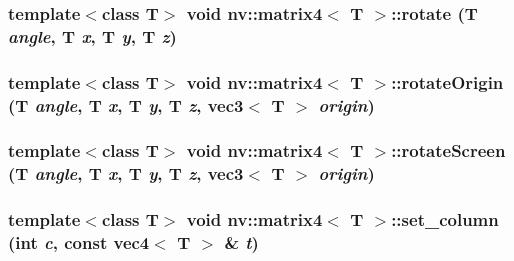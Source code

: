 \hypertarget{classnv_1_1matrix4_219e377b04b656c751c6d5ebdaa3505b}{
\subsubsection[{rotate}]{\setlength{\rightskip}{0pt plus 5cm}template$<$class T$>$ void {\bf nv::matrix4}$<$ T $>$::rotate (T {\em angle}, \/  T {\em x}, \/  T {\em y}, \/  T {\em z})}}
\label{classnv_1_1matrix4_219e377b04b656c751c6d5ebdaa3505b}


\hypertarget{classnv_1_1matrix4_addeaba225f0322e3819cc146b7a9887}{
\subsubsection[{rotateOrigin}]{\setlength{\rightskip}{0pt plus 5cm}template$<$class T$>$ void {\bf nv::matrix4}$<$ T $>$::rotateOrigin (T {\em angle}, \/  T {\em x}, \/  T {\em y}, \/  T {\em z}, \/  {\bf vec3}$<$ T $>$ {\em origin})}}
\label{classnv_1_1matrix4_addeaba225f0322e3819cc146b7a9887}


\hypertarget{classnv_1_1matrix4_0ce61396b900fbfeb6ac3cb93fb43a07}{
\subsubsection[{rotateScreen}]{\setlength{\rightskip}{0pt plus 5cm}template$<$class T$>$ void {\bf nv::matrix4}$<$ T $>$::rotateScreen (T {\em angle}, \/  T {\em x}, \/  T {\em y}, \/  T {\em z}, \/  {\bf vec3}$<$ T $>$ {\em origin})}}
\label{classnv_1_1matrix4_0ce61396b900fbfeb6ac3cb93fb43a07}


\hypertarget{classnv_1_1matrix4_9a8f45e4b6f47e49074e27c5a5bb5ed6}{
\subsubsection[{set\_\-column}]{\setlength{\rightskip}{0pt plus 5cm}template$<$class T$>$ void {\bf nv::matrix4}$<$ T $>$::set\_\-column (int {\em c}, \/  const {\bf vec4}$<$ T $>$ \& {\em t})}}
\label{classnv_1_1matrix4_9a8f45e4b6f47e49074e27c5a5bb5ed6}


